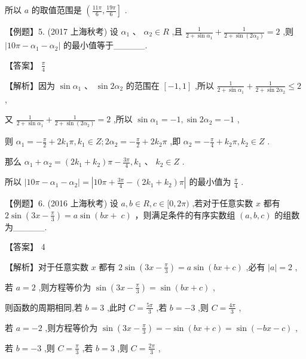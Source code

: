 \documentclass[10pt]{article}
\begin{document}
所以 \(a\) 的取值范围是 \(\left( {\frac{11\pi }{6},\frac{19\pi }{6}}\right\rbrack\) .

【例题】5. (2017 上海秋考) 设 \({\alpha }_{1}\text{ 、 }{\alpha }_{2} \in  R\) ,且 \(\frac{1}{2 + \sin {\alpha }_{1}} + \frac{1}{2 + \sin \left( {2{\alpha }_{2}}\right) } = 2\) ,则 \(\left| {{10\pi } - {\alpha }_{1} - {\alpha }_{2}}\right|\) 的最小值等于\_\_\_\_\_.

【答案】 \(\frac{\pi }{4}\)

【解析】因为 \(\sin {\alpha }_{1}\text{ 、 }\sin 2{\alpha }_{2}\) 的范围在 \(\left\lbrack  {-1,1}\right\rbrack\) ,所以 \(\frac{1}{2 + \sin {\alpha }_{1}} + \frac{1}{2 + \sin 2{\alpha }_{2}} \leq  2\) ,

又 \(\frac{1}{2 + \sin {\alpha }_{1}} + \frac{1}{2 + \sin \left( {2{\alpha }_{2}}\right) } = 2\) ,所以 \(\sin {\alpha }_{1} =  - 1,\sin 2{\alpha }_{2} =  - 1\) ,

则 \({\alpha }_{1} =  - \frac{\pi }{2} + 2{k}_{1}\pi ,{k}_{1} \in  Z;2{\alpha }_{2} =  - \frac{\pi }{2} + 2{k}_{2}\pi\) ,即 \({\alpha }_{2} =  - \frac{\pi }{4} + {k}_{2}\pi ,{k}_{2} \in  Z\) .

那么 \({\alpha }_{1} + {\alpha }_{2} = \left( {2{k}_{1} + {k}_{2}}\right) \pi  - \frac{3\pi }{4},{k}_{1}\text{ 、 }{k}_{2} \in  Z\) .

所以 \(\left| {{10\pi } - {\alpha }_{1} - {\alpha }_{2}}\right|  = \left| {{10\pi } + \frac{3\pi }{4} - \left( {2{k}_{1} + {k}_{2}}\right) \pi }\right|\) 的最小值为 \(\frac{\pi }{4}\) .

【例题】6. (2016 上海秋考) 设 \(a,b \in  R,c \in  \lbrack 0,{2\pi })\) ,若对于任意实数 \(x\) 都有 \(2\sin \left( {{3x} - \frac{\pi }{3}}\right)  = a\sin ({bx} + \; c)\) ，则满足条件的有序实数组 \(\left( {a,b,c}\right)\) 的组数为\_\_\_\_\_.

【答案】 4

【解析】对于任意实数 \(x\) 都有 \(2\sin \left( {{3x} - \frac{\pi }{3}}\right)  = a\sin \left( {{bx} + c}\right)\) ,必有 \(\left| a\right|  = 2\) ,

若 \(a = 2\) ,则方程等价为 \(\sin \left( {{3x} - \frac{\pi }{3}}\right)  = \sin \left( {{bx} + c}\right)\) ,

则函数的周期相同,若 \(b = 3\) ,此时 \(C = \frac{5\pi }{3}\) ,若 \(b =  - 3\) ,则 \(C = \frac{4\pi }{3}\) ,

若 \(a =  - 2\) ,则方程等价为 \(\sin \left( {{3x} - \frac{\pi }{3}}\right)  =  - \sin \left( {{bx} + c}\right)  = \sin \left( {-{bx} - c}\right)\) ,

若 \(b =  - 3\) ,则 \(C = \frac{\pi }{3}\) ,若 \(b = 3\) ,则 \(C = \frac{2\pi }{3}\) ,
\end{document}
